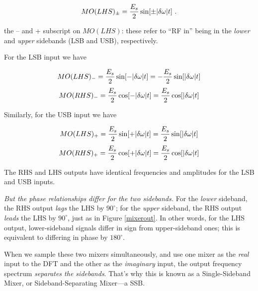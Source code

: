 \documentclass[11pt,preprint]{aastex}
\begin{document}
\begin{equation}
MO(LHS)_\pm = {E_s \over 2} \sin [\pm|\delta \omega | t] \ .
\end{equation}

 the -- and + subscript on $MO(LHS)$: these refer to
``RF in'' being in the {\it lower} and {\it upper} sidebands (LSB and
USB), respectively.

For the LSB input we have

\begin{mathletters} \label{lsb}
\begin{equation}
MO(LHS)_- = {E_s \over 2} \sin [-|\delta \omega | t] =
   -{E_s \over 2} \sin [|\delta \omega | t]
\end{equation}
\begin{equation}
MO(RHS)_- = {E_s \over 2} \cos [-|\delta \omega | t] =
   {E_s \over 2} \cos [|\delta \omega | t]
\end{equation}
\end{mathletters}

\noindent Similarly, for the USB input we have

\begin{mathletters} \label{usb}
\begin{equation}
MO(LHS)_+ = {E_s \over 2} \sin [+|\delta \omega | t] =
   {E_s \over 2} \sin [|\delta \omega | t]
\end{equation}
\begin{equation}
MO(RHS)_+ = {E_s \over 2} \cos [+|\delta \omega | t] =
   {E_s \over 2} \cos [|\delta \omega | t]
\end{equation}
\end{mathletters}

\noindent The RHS and LHS outputs have identical frequencies and
amplitudes for the LSB and USB inputs.

{\it But the phase relationships differ for the two sidebands.}  For the
{\it lower} sideband, the RHS output {\it lags} the LHS by $90^\circ$;
for the {\it upper} sideband, the RHS output {\it leads} the LHS by
$90^\circ$, just as in Figure \ref{mixerout}. In other words, for the
LHS output, lower-sideband signals differ in sign from upper-sideband
ones; this is equivalent to differing in phase by $180^\circ$.

When we sample these two mixers simultaneously, and use one mixer as the
{\it real} input to the DFT and the other as the {\it imaginary} input,
the output frequency spectrum {\it separates the sidebands}. That's why
this is known as a Single-Sideband Mixer, or Sideband-Separating
Mixer---a SSB.
\end{document}

